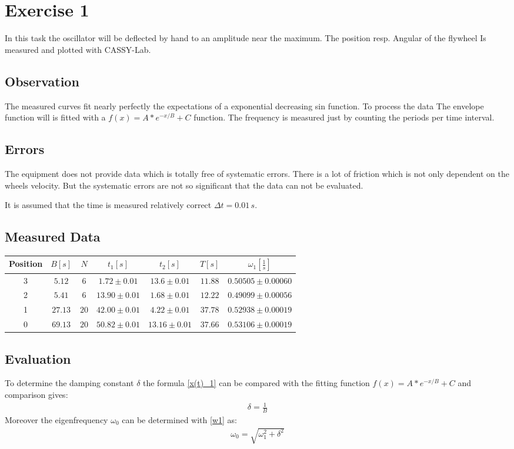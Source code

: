 \newpage
\section{Exercise 1}
In this task the oscillator will be deflected by hand to an amplitude near the maximum. The position resp. Angular of the flywheel Is measured and plotted with CASSY-Lab. 
\subsection{Observation}
The measured curves fit nearly perfectly the expectations of a exponential decreasing sin function. To process the data The envelope function will is fitted with a \(f(x)=A*e^{-x/B}+C\) function. The frequency  is measured just by counting the periods per time interval.
\subsection{Errors}
The equipment does not provide data which is totally free of systematic errors. There is a lot of friction which is not only dependent on the wheels velocity. But the systematic errors are not so significant that the data can not be evaluated.

It is assumed that the time is measured relatively correct \(\Delta t = 0.01\, s\). 
\subsection{Measured Data}
\begin{center}
\begin{tabular}{c|cccccc}
Position & \(B [s]\) & \(N\) & \(t_1 [s]\) & \(t_2 [s]\) & \(T [s]\) & \(\omega_1 [\frac{1}{s}]\) \\ \hline
3 & \(5.12\) & \(6\) & \(1.72 \pm 0.01\) & \(13.6 \pm 0.01\) & \(11.88\) & \(0.50505 \pm 0.00060\) \\ 
2 & \(5.41\) & \(6\) & \(13.90 \pm 0.01\) & \(1.68 \pm 0.01\) & \(12.22\) & \(0.49099 \pm 0.00056\) \\ 
1 & \(27.13\) & \(20\) & \(42.00 \pm 0.01\) & \(4.22 \pm 0.01\) & \(37.78\) & \(0.52938 \pm 0.00019\) \\ 
0 & \(69.13\) & \(20\) & \(50.82 \pm 0.01\) & \(13.16 \pm 0.01\) & \(37.66\) & \(0.53106 \pm 0.00019\) \\
\end{tabular}
\end{center}
\subsection{Evaluation}
To determine the damping constant \(\delta\) the formula \eqref{x(t)_1} can be compared with the fitting function \(f(x)=A*e^{-x/B}+C\) and comparison gives:
\begin{align}
\delta = \frac{1}{B}
\end{align}
Moreover the eigenfrequency \(\omega_0\) can be determined with \eqref{w1} as:
\begin{align}
\omega_0 = \sqrt{\omega_1^2 + \delta^2}
\end{align}